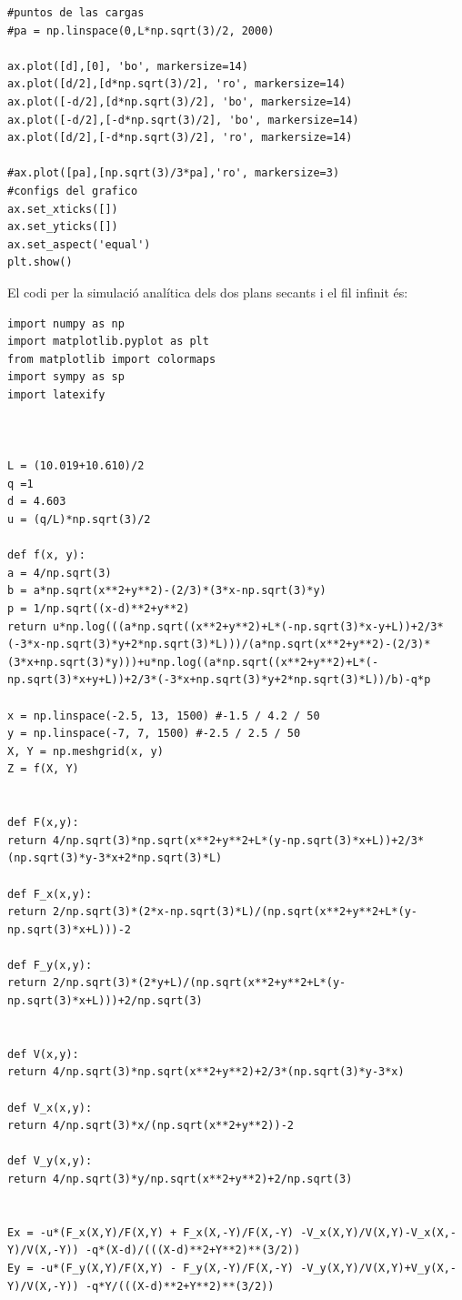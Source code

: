 \documentclass[a4paper,10.5pt]{report}
\begin{document}
\begin{appendices}
\begin{lstlisting}
#puntos de las cargas
#pa = np.linspace(0,L*np.sqrt(3)/2, 2000)

ax.plot([d],[0], 'bo', markersize=14)
ax.plot([d/2],[d*np.sqrt(3)/2], 'ro', markersize=14)
ax.plot([-d/2],[d*np.sqrt(3)/2], 'bo', markersize=14)
ax.plot([-d/2],[-d*np.sqrt(3)/2], 'bo', markersize=14)
ax.plot([d/2],[-d*np.sqrt(3)/2], 'ro', markersize=14)

#ax.plot([pa],[np.sqrt(3)/3*pa],'ro', markersize=3)
#configs del grafico
ax.set_xticks([])
ax.set_yticks([])
ax.set_aspect('equal')
plt.show()
\end{lstlisting}

El codi per la simulació analítica dels dos plans secants i el fil infinit és:
\begin{lstlisting}
import numpy as np
import matplotlib.pyplot as plt
from matplotlib import colormaps
import sympy as sp
import latexify



L = (10.019+10.610)/2
q =1
d = 4.603
u = (q/L)*np.sqrt(3)/2

def f(x, y):
a = 4/np.sqrt(3)
b = a*np.sqrt(x**2+y**2)-(2/3)*(3*x-np.sqrt(3)*y)
p = 1/np.sqrt((x-d)**2+y**2)
return u*np.log(((a*np.sqrt((x**2+y**2)+L*(-np.sqrt(3)*x-y+L))+2/3*(-3*x-np.sqrt(3)*y+2*np.sqrt(3)*L)))/(a*np.sqrt(x**2+y**2)-(2/3)*(3*x+np.sqrt(3)*y)))+u*np.log((a*np.sqrt((x**2+y**2)+L*(-np.sqrt(3)*x+y+L))+2/3*(-3*x+np.sqrt(3)*y+2*np.sqrt(3)*L))/b)-q*p

x = np.linspace(-2.5, 13, 1500) #-1.5 / 4.2 / 50
y = np.linspace(-7, 7, 1500) #-2.5 / 2.5 / 50
X, Y = np.meshgrid(x, y)
Z = f(X, Y)


def F(x,y):
return 4/np.sqrt(3)*np.sqrt(x**2+y**2+L*(y-np.sqrt(3)*x+L))+2/3*(np.sqrt(3)*y-3*x+2*np.sqrt(3)*L)

def F_x(x,y):
return 2/np.sqrt(3)*(2*x-np.sqrt(3)*L)/(np.sqrt(x**2+y**2+L*(y-np.sqrt(3)*x+L)))-2

def F_y(x,y):
return 2/np.sqrt(3)*(2*y+L)/(np.sqrt(x**2+y**2+L*(y-np.sqrt(3)*x+L)))+2/np.sqrt(3)


def V(x,y):
return 4/np.sqrt(3)*np.sqrt(x**2+y**2)+2/3*(np.sqrt(3)*y-3*x)

def V_x(x,y):
return 4/np.sqrt(3)*x/(np.sqrt(x**2+y**2))-2

def V_y(x,y):
return 4/np.sqrt(3)*y/np.sqrt(x**2+y**2)+2/np.sqrt(3)


Ex = -u*(F_x(X,Y)/F(X,Y) + F_x(X,-Y)/F(X,-Y) -V_x(X,Y)/V(X,Y)-V_x(X,-Y)/V(X,-Y)) -q*(X-d)/(((X-d)**2+Y**2)**(3/2))
Ey = -u*(F_y(X,Y)/F(X,Y) - F_y(X,-Y)/F(X,-Y) -V_y(X,Y)/V(X,Y)+V_y(X,-Y)/V(X,-Y)) -q*Y/(((X-d)**2+Y**2)**(3/2))


\end{lstlisting}
\end{appendices}
\end{document}
